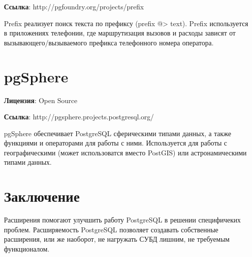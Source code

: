 \textbf{Ссылка}: http://pgfoundry.org/projects/prefix

Prefix реализует поиск текста по префиксу (prefix @> text). 
Prefix используется в приложениях телефонии, где маршрутизация вызовов и расходы зависят от 
вызывающего/вызываемого префикса телефонного номера оператора.

\section{pgSphere}
\textbf{Лицензия}: Open Source

\textbf{Ссылка}: http://pgsphere.projects.postgresql.org/

pgSphere обеспечивает PostgreSQL сферическими типами данных, а также функциями и операторами для работы с ними. 
Используется для работы с географическими (может использоватся вместо PostGIS) или астронамическими типами данных.

\section{Заключение}
Расширения помогают улучшить работу PostgreSQL в решении специфичеких проблем. Расширяемость PostgreSQL позволяет создавать собственные расширения, 
или же наоборот, не нагружать СУБД лишним, не требуемым функционалом.